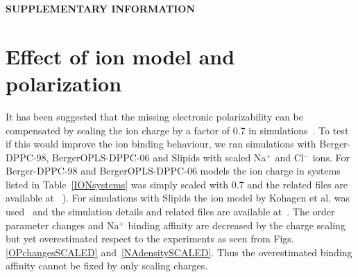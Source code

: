 \documentclass[pre,aps,floatfix,authordate1-4,twocolumn]{revtex4-1}
\begin{document}
\newpage

\appendix
\begin{center}
{\bf SUPPLEMENTARY INFORMATION}
\end{center}

\section{Effect of ion model and polarization}
It has been suggested that the missing electronic polarizability 
can be compensated by scaling the ion charge by a factor of 0.7 in 
simulations~\cite{leontyev11}. To test if this would improve the ion 
binding behaviour, we ran simulations with Berger-DPPC-98, BergerOPLS-DPPC-06
and Slipids with scaled Na$^+$ and Cl$^-$ ions. For Berger-DPPC-98 and BergerOPLS-DPPC-06 models 
the ion charge in systems listed in Table~\ref{IONsystems} was simply scaled with 0.7 and
the related files are available 
at ~\cite{DPPCBergerNaCl150mMscaled,DPPCBergerNaCl1000mMscaled,DPPCBergerOPLS06NaCl150mMscaled,DPPCBergerOPLS06NaCl1000mMscaled}). 
For simulations with Slipids the ion model by Kohagen et al. was used~\cite{kohagen15} and the simulation
details and related files are available at~\cite{slipidsFILESpopcSCALED}.
The order parameter changes and Na$^+$ binding affinity are decreased by the charge scaling but 
yet overestimated respect to the experiments as seen from Figs. \ref{OPchangesSCALED} and~\ref{NAdensitySCALED}. 
Thus the overestimated binding affinity cannot be fixed by only scaling charges.




\end{document}
